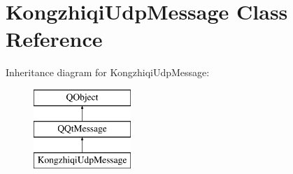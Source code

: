 \hypertarget{class_kongzhiqi_udp_message}{}\section{Kongzhiqi\+Udp\+Message Class Reference}
\label{class_kongzhiqi_udp_message}
Inheritance diagram for Kongzhiqi\+Udp\+Message\+:\begin{figure}[H]
\begin{center}
\leavevmode
\includegraphics[height=3.000000cm]{class_kongzhiqi_udp_message}
\end{center}
\end{figure}
